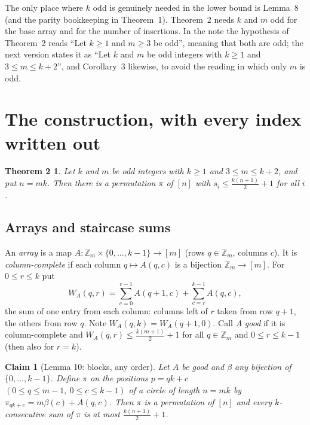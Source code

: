 \documentclass[11pt]{amsart}
\newtheorem{claim}{Claim}
\newtheorem*{thmA}{Theorem 2}
\theoremstyle{remark}
\newcommand{\Z}{\mathbb{Z}}
\begin{document}
\medskip
The only place where $k$ odd is genuinely needed in the lower bound is Lemma~8 (and the parity bookkeeping in
Theorem~1). Theorem~2 needs $k$ and $m$ odd for the base array and for the number of insertions. In the note the
hypothesis of Theorem~2 reads ``Let $k\ge1$ and $m\ge3$ be odd'', meaning that both are odd; the next version states
it as ``Let $k$ and $m$ be odd integers with $k\ge1$ and $3\le m\le k+2$'', and Corollary~3 likewise, to avoid the
reading in which only $m$ is odd.

\section{The construction, with every index written out}

\begin{thmA}
Let $k$ and $m$ be odd integers with $k\ge1$ and $3\le m\le k+2$, and put $n=mk$. Then there is a permutation
$\pi$ of $[n]$ with $s_i\le\frac{k(n+1)}2+1$ for all $i$.
\end{thmA}

\subsection*{Arrays and staircase sums}
An \emph{array} is a map $A:\Z_m\times\{0,\dots,k-1\}\to[m]$ (rows $q\in\Z_m$, columns $c$). It is
\emph{column-complete} if each column $q\mapsto A(q,c)$ is a bijection $\Z_m\to[m]$. For $0\le r\le k$ put
\[
W_A(q,r)=\sum_{c=0}^{r-1}A(q+1,c)+\sum_{c=r}^{k-1}A(q,c),
\]
the sum of one entry from each column: columns left of $r$ taken from row $q+1$, the others from row $q$. Note
$W_A(q,k)=W_A(q+1,0)$. Call $A$ \emph{good} if it is column-complete and $W_A(q,r)\le\frac{k(m+1)}2+1$ for all
$q\in\Z_m$ and $0\le r\le k-1$ (then also for $r=k$).

\begin{claim}[Lemma 10: blocks, any order]
Let $A$ be good and $\beta$ \emph{any} bijection of $\{0,\dots,k-1\}$. Define $\pi$ on the positions $p=qk+c$
$(0\le q\le m-1,\ 0\le c\le k-1)$ of a circle of length $n=mk$ by $\pi_{qk+c}=m\beta(c)+A(q,c)$. Then $\pi$ is a
permutation of $[n]$ and every $k$-consecutive sum of $\pi$ is at most $\frac{k(n+1)}2+1$.
\end{claim}
\end{document}
